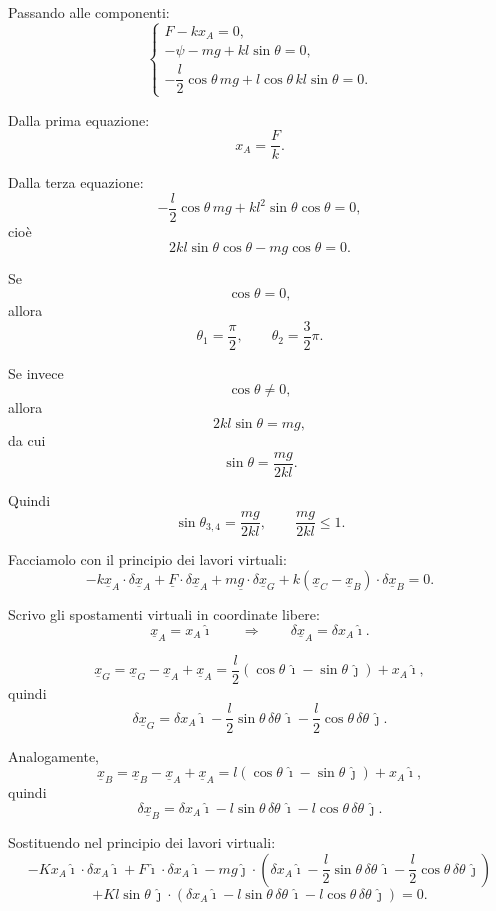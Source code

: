 \begin{example}{}
Passando alle componenti:
\[
\left\{
\begin{array}{l}
F-kx_A=0,
\\[1mm]
-\psi-mg+kl\sin\theta=0,
\\[1mm]
-\dfrac{l}{2}\cos\theta\,mg
+
l\cos\theta\,kl\sin\theta
=0.
\end{array}
\right.
\]

Dalla prima equazione:
\[
x_A=\frac{F}{k}.
\]

Dalla terza equazione:
\[
-\frac{l}{2}\cos\theta\,mg
+
kl^2\sin\theta\cos\theta
=0,
\]
cioè
\[
2kl\sin\theta\cos\theta
-
mg\cos\theta
=0.
\]

Se
\[
\cos\theta=0,
\]
allora
\[
\theta_1=\frac{\pi}{2},
\qquad
\theta_2=\frac{3}{2}\pi.
\]

Se invece
\[
\cos\theta\neq 0,
\]
allora
\[
2kl\sin\theta=mg,
\]
da cui
\[
\sin\theta=\frac{mg}{2kl}.
\]

Quindi
\[
\sin\theta_{3,4}
=
\frac{mg}{2kl},
\qquad
\frac{mg}{2kl}\leq 1.
\]

Facciamolo con il principio dei lavori virtuali:
\[
-k\underline{x}_A\cdot \delta\underline{x}_A
+
\underline{F}\cdot \delta\underline{x}_A
+
m\underline{g}\cdot \delta\underline{x}_G
+
k\left(\underline{x}_C-\underline{x}_B\right)\cdot
\delta\underline{x}_B
=
0.
\]

Scrivo gli spostamenti virtuali in coordinate libere:
\[
\underline{x}_A
=
x_A\hat{\imath}
\qquad \Longrightarrow \qquad
\delta\underline{x}_A
=
\delta x_A\hat{\imath}.
\]

\[
\underline{x}_G
=
\underline{x}_G-\underline{x}_A+\underline{x}_A
=
\frac{l}{2}
\left(
\cos\theta\,\hat{\imath}
-
\sin\theta\,\hat{\jmath}
\right)
+
x_A\hat{\imath},
\]
quindi
\[
\delta\underline{x}_G
=
\delta x_A\hat{\imath}
-
\frac{l}{2}\sin\theta\,\delta\theta\,\hat{\imath}
-
\frac{l}{2}\cos\theta\,\delta\theta\,\hat{\jmath}.
\]

Analogamente,
\[
\underline{x}_B
=
\underline{x}_B-\underline{x}_A+\underline{x}_A
=
l
\left(
\cos\theta\,\hat{\imath}
-
\sin\theta\,\hat{\jmath}
\right)
+
x_A\hat{\imath},
\]
quindi
\[
\delta\underline{x}_B
=
\delta x_A\hat{\imath}
-
l\sin\theta\,\delta\theta\,\hat{\imath}
-
l\cos\theta\,\delta\theta\,\hat{\jmath}.
\]

Sostituendo nel principio dei lavori virtuali:
\[
-Kx_A\hat{\imath}\cdot \delta x_A\hat{\imath}
+
F\hat{\imath}\cdot \delta x_A\hat{\imath}
-
mg\hat{\jmath}\cdot
\left(
\delta x_A\hat{\imath}
-
\frac{l}{2}\sin\theta\,\delta\theta\,\hat{\imath}
-
\frac{l}{2}\cos\theta\,\delta\theta\,\hat{\jmath}
\right)
\]
\[
+
Kl\sin\theta\,\hat{\jmath}\cdot
\left(
\delta x_A\hat{\imath}
-
l\sin\theta\,\delta\theta\,\hat{\imath}
-
l\cos\theta\,\delta\theta\,\hat{\jmath}
\right)
=
0.
\]


\end{example}
